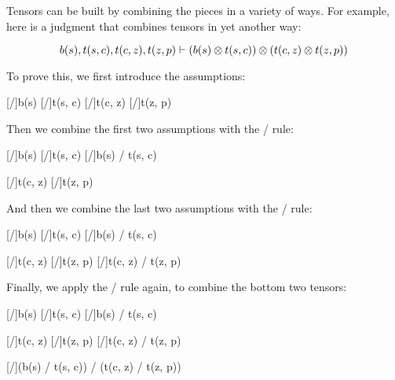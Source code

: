\documentclass[../../../main.tex]{subfiles}
\begin{document}
Tensors can be built by combining the pieces in a variety of ways. For example, here is a judgment that combines tensors in yet another way:

\begin{equation*}
  b(s), t(s, c), t(c, z), t(z, p) \ndturnstile/ (b(s) \tensor/ t(s, c)) \tensor/ (t(c, z) \tensor/ t(z, p))
\end{equation*}

\noindent
To prove this, we first introduce the assumptions:

\begin{prooftree*}
  \hypo{}
  [\startrule/]{b(s)}
  \hypo{}
  [\startrule/]{t(s, c)}
  \hypo{}
  [\startrule/]{t(c, z)}
  \hypo{}
  [\startrule/]{t(z, p)}
\end{prooftree*}

\noindent
Then we combine the first two assumptions with the \tensorIntro/ rule:

\begin{prooftree*}
  \hypo{}
  [\startrule/]{b(s)}
  \hypo{}
  [\startrule/]{t(s, c)}
  [\tensorIntro/]{b(s) \tensor/ t(s, c)}

  \hypo{}
  [\startrule/]{t(c, z)}
  \hypo{}
  [\startrule/]{t(z, p)}
  
\end{prooftree*}

\noindent
And then we combine the last two assumptions with the \tensorIntro/ rule:

\begin{prooftree*}
  \hypo{}
  [\startrule/]{b(s)}
  \hypo{}
  [\startrule/]{t(s, c)}
  [\tensorIntro/]{b(s) \tensor/ t(s, c)}

  \hypo{}
  [\startrule/]{t(c, z)}
  \hypo{}
  [\startrule/]{t(z, p)}
  [\tensorIntro/]{t(c, z) \tensor/ t(z, p)}
  
\end{prooftree*}

\noindent
Finally, we apply the \tensorIntro/ rule again, to combine the bottom two tensors:

\begin{prooftree*}
  \hypo{}
  [\startrule/]{b(s)}
  \hypo{}
  [\startrule/]{t(s, c)}
  [\tensorIntro/]{b(s) \tensor/ t(s, c)}

  \hypo{}
  [\startrule/]{t(c, z)}
  \hypo{}
  [\startrule/]{t(z, p)}
  [\tensorIntro/]{t(c, z) \tensor/ t(z, p)}
  
  [\tensorIntro/]{(b(s) \tensor/ t(s, c)) \tensor/ (t(c, z) \tensor/ t(z, p))}
\end{prooftree*}
\end{document}
